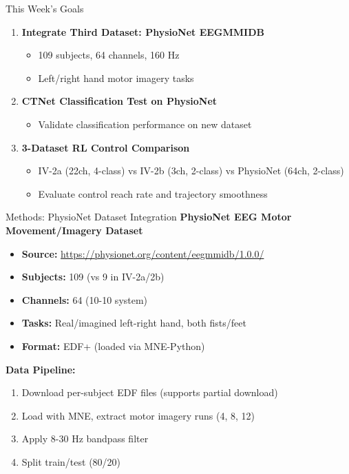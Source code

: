 \documentclass[aspectratio=169, 11pt]{beamer}
\begin{document}
\begin{frame}{This Week's Goals}
    \begin{enumerate}
        \item \textbf{Integrate Third Dataset: PhysioNet EEGMMIDB}
        \begin{itemize}
            \item 109 subjects, 64 channels, 160 Hz
            \item Left/right hand motor imagery tasks
        \end{itemize}
        
        \vspace{3mm}
        \item \textbf{CTNet Classification Test on PhysioNet}
        \begin{itemize}
            \item Validate classification performance on new dataset
        \end{itemize}
        
        \vspace{3mm}
        \item \textbf{3-Dataset RL Control Comparison}
        \begin{itemize}
            \item IV-2a (22ch, 4-class) vs IV-2b (3ch, 2-class) vs PhysioNet (64ch, 2-class)
            \item Evaluate control reach rate and trajectory smoothness
        \end{itemize}
    \end{enumerate}
\end{frame}

\begin{frame}{Methods: PhysioNet Dataset Integration}
    \textbf{PhysioNet EEG Motor Movement/Imagery Dataset}
    \begin{itemize}
        \item \textbf{Source:} \url{https://physionet.org/content/eegmmidb/1.0.0/}
        \item \textbf{Subjects:} 109 (vs 9 in IV-2a/2b)
        \item \textbf{Channels:} 64 (10-10 system)
        \item \textbf{Tasks:} Real/imagined left-right hand, both fists/feet
        \item \textbf{Format:} EDF+ (loaded via MNE-Python)
    \end{itemize}
    
    \vspace{3mm}
    \textbf{Data Pipeline:}
    \begin{enumerate}
        \item Download per-subject EDF files (supports partial download)
        \item Load with MNE, extract motor imagery runs (4, 8, 12)
        \item Apply 8-30 Hz bandpass filter
        \item Split train/test (80/20)
    \end{enumerate}
\end{frame}
\end{document}
